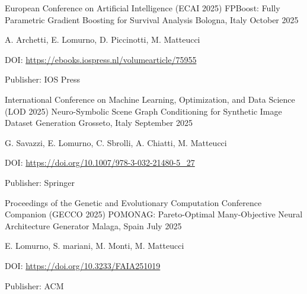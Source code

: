 \begin{cventries}
    \vspace{2mm}
    \cventry
        {European Conference on Artificial Intelligence (ECAI 2025)} 
        {FPBoost: Fully Parametric Gradient Boosting for Survival Analysis}
        {Bologna, Italy}
        {October 2025}
        {
        \begin{cvitems}
            \item {A. Archetti, E. Lomurno, D. Piccinotti, M. Matteucci}
            \item {DOI: \url{https://ebooks.iospress.nl/volumearticle/75955}}
            \item {Publisher: IOS Press}
        \end{cvitems}
        }

    \vspace{2mm}
    \cventry
        {International Conference on Machine Learning, Optimization, and Data Science (LOD 2025)} 
        {Neuro-Symbolic Scene Graph Conditioning for Synthetic Image Dataset Generation}
        {Grosseto, Italy}
        {September 2025}
        {
        \begin{cvitems}
            \item {G. Savazzi, E. Lomurno, C. Sbrolli, A. Chiatti, M. Matteucci}
            \item {DOI: \url{https://doi.org/10.1007/978-3-032-21480-5_27}}
            \item {Publisher: Springer}
        \end{cvitems}
        }

    \vspace{2mm}
    \cventry
        {Proceedings of the Genetic and Evolutionary Computation Conference Companion (GECCO 2025)} 
        {POMONAG: Pareto-Optimal Many-Objective Neural Architecture Generator}
        {Malaga, Spain}
        {July 2025}
        {
        \begin{cvitems}
            \item {E. Lomurno, S. mariani, M. Monti, M. Matteucci}
            \item {DOI: \url{https://doi.org/10.3233/FAIA251019}}
            \item {Publisher: ACM}
        \end{cvitems}
        }


\end{cventries}
